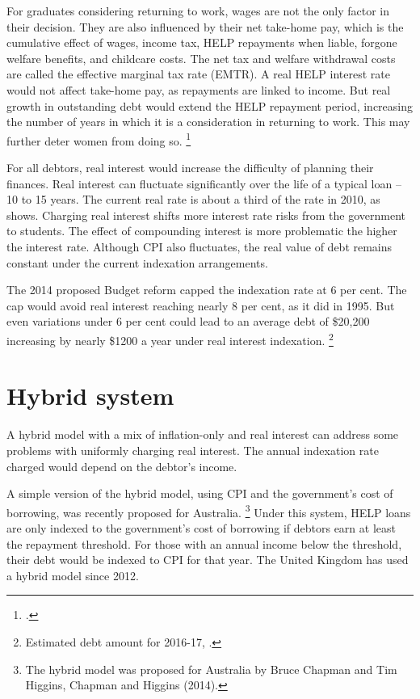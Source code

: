 \documentclass[embargoed]{grattan}
\begin{document}
For graduates considering returning to work, wages are not the only factor in their decision.
They are also influenced by their net take-home pay, which is the cumulative effect of wages, income tax, \gls{HELP} repayments when liable, forgone welfare benefits, and childcare costs.
The net tax and welfare withdrawal costs are called the effective marginal tax rate (EMTR).
A real \gls{HELP} interest rate would not affect take-home pay, as repayments are linked to income.
But real growth in outstanding debt would extend the \gls{HELP} repayment period, increasing the number of years in which it is a consideration in returning to work.
This may further deter women from doing so.%
\footcites[][Section~4.2.1]{Daley2012Gamechangerseconomic}{Commission2014Childcareearlychildhood}


For all debtors, real interest would increase the difficulty of planning their finances.
Real interest can fluctuate significantly over the life of a typical loan -- 10 to 15 years.
The current real rate is about a third of the rate in 2010, as  shows.
Charging real interest shifts more interest rate risks from the government to students.
The effect of compounding interest is more problematic the higher the interest rate.
Although \gls{CPI} also fluctuates, the real value of debt remains constant under the current indexation arrangements.

The 2014 proposed Budget reform capped the indexation rate at 6 per cent.
The cap would avoid real interest reaching nearly 8 per cent, as it did in 1995.
But even variations under 6 per cent could lead to an average debt of \$20,200 increasing by nearly \$1200 a year under real interest indexation.%
\footnote{Estimated debt amount for 2016-17, \textcite[][59]{Education2016Portfoliobudgetstatements}.}

\section{Hybrid system}\label{sec:hybrid-system}

A hybrid model with a mix of inflation-only and real interest can address some problems with uniformly charging real interest.
The annual indexation rate charged would depend on the debtor's income.

A simple version of the hybrid model, using \gls{CPI} and the government's cost of borrowing, was recently proposed for Australia.%
\footnote{The hybrid model was proposed for Australia by Bruce Chapman and Tim Higgins, Chapman and Higgins (2014).} Under this system, \gls{HELP} loans are only indexed to the government's cost of borrowing if debtors earn at least the repayment threshold.
For those with an annual income below the threshold, their debt would be indexed to \gls{CPI} for that year.
The United Kingdom has used a hybrid model since 2012.
\end{document}
